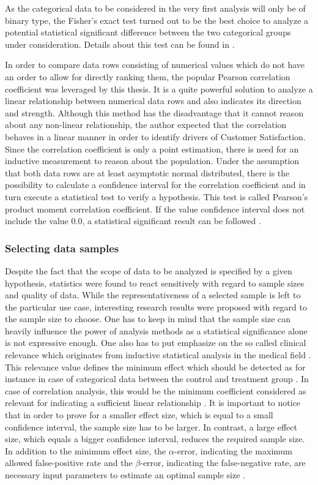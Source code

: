 As the categorical data to be considered in the very first analysis will only be of binary type, the Fisher's exact test turned out to be the best choice to analyze a potential statistical significant difference between the two categorical groups under consideration. Details about this test can be found in \cite{fishers1992}. 

In order to compare data rows consisting of numerical values which do not have an order to allow for directly ranking  them, the popular Pearson correlation coefficient was leveraged by this thesis. It is a quite powerful solution to analyze a linear relationship between numerical data rows and also indicates its direction and strength. Although this method has the disadvantage that it cannot reason about any non-linear relationship, the author expected that the correlation behaves in a linear manner in order to identify drivers of Customer Satisfaction. Since the correlation coefficient is only a point estimation, there is need for an inductive measurement to reason about the population. Under the assumption that both data rows are at least asymptotic normal distributed, there is the possibility to calculate a confidence interval for the correlation coefficient and in turn execute a statistical test to verify a hypothesis. This test is called Pearson's product moment correlation coefficient. If the value confidence interval does not include the value $0.0$, a statistical significant result can be followed \cite{lee1988thirteen} \cite{artusi2002bravais}. 

\subsubsection{Selecting data samples}
Despite the fact that the scope of data to be analyzed is specified by a given hypothesis, statistics were found to react sensitively with regard to sample sizes and quality of data. While the representativeness of a selected sample is left to the particular use case, interesting research results were proposed with regard to the sample size to choose. One has to keep in mind that the sample size can heavily influence the power of analysis methods as a statistical significance alone is not expressive enough. One also has to put emphasize on the so called clinical relevance which originates from inductive statistical analysis in the medical field \cite{campbell1995estimating}. This relevance value defines the minimum effect which should be detected as for instance in case of categorical data between the control and treatment group \cite{kadam2010sample}. In case of correlation analysis, this would be the minimum coefficient considered as relevant for indicating a sufficient linear relationship \cite{moinester2014sample}. It is important to notice that in order to prove for a smaller effect size, which is equal to a small confidence interval, the sample size has to be larger. In contrast, a large effect size, which equals a bigger confidence interval, reduces the required sample size. In addition to the minimum effect size, the $\alpha$-error, indicating the maximum allowed false-positive rate and the $\beta$-error, indicating the false-negative rate, are necessary input parameters to estimate an optimal sample size \cite{kadam2010sample}.

